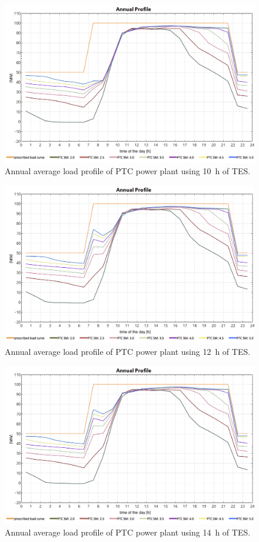 %
\begin{figure}[htbp]  
\centering
\includegraphics[width=0.8\linewidth]{FIG/Appendix_LCC/PTC10h}
\caption[Annual average load profile of PTC power plant using 10~h of TES.]{Annual average load profile of PTC power plant using 10~h of TES.}\label{PTC10h}
\end{figure}
%
\begin{figure}[htbp]  
\centering
\includegraphics[width=0.8\linewidth]{FIG/Appendix_LCC/PTC12h}
\caption[Annual average load profile of PTC power plant using 12~h of TES.]{Annual average load profile of PTC power plant using 12~h of TES.}\label{PTC12h}
\end{figure}
%
\begin{figure}[htbp]  
\centering
\includegraphics[width=0.8\linewidth]{FIG/Appendix_LCC/PTC14h}
\caption[Annual average load profile of PTC power plant using 14~h of TES.]{Annual average load profile of PTC power plant using 14~h of TES.}\label{CR14h}
\end{figure}
